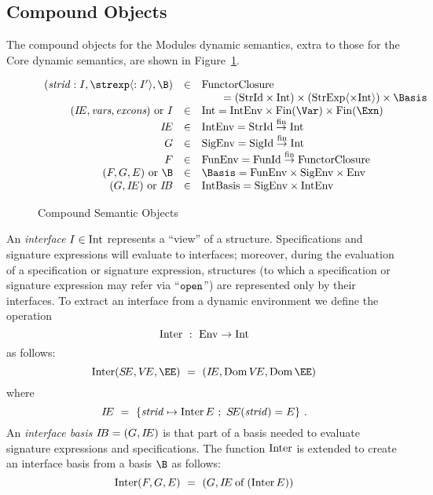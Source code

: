 \subsection{Compound Objects}
\label{dynmod-comp-obj-sec}
The compound objects for the Modules dynamic semantics, extra to those for the
Core dynamic semantics, are shown in Figure~\ref{comp-dynmod-obj}.
\begin{figure}[h]
\vspace{2pt}
\begin{displaymath}
\begin{array}{rcl}
(\strid:\I,\strexp\langle:\I'\rangle,\B)
                & \in   & \FunctorClosure\\
                &       & \qquad  = (\StrId\times\Int)\times
                          (\StrExp\langle\times\Int\rangle)\times\Basis\\
(\IE,\vars,\exns)\ {\rm or}\ \I
                & \in   & \Int = \IntEnv\times\Fin(\Var)\times\Fin(\Exn)\\
        \IE     & \in   & \IntEnv = \finfun{\StrId}{\Int}\\
        \G 	& \in	& \SigEnv = \finfun{\SigId}{\Int}\\
        \F	& \in	& \FunEnv = \finfun{\FunId}{\FunctorClosure}\\
(\F,\G,\E)\ {\rm or}\ \B
                & \in   & \Basis = \FunEnv\times\SigEnv\times\Env\\
(\G,\IE)\ {\rm or}\ \IB
                & \in   & \IntBasis = \SigEnv\times\IntEnv
\end{array}
\end{displaymath}
\caption{Compound Semantic Objects}
\label{comp-dynmod-obj}
\vspace{3pt}
\end{figure}
%
%
An {\sl interface} $I\in{\rm Int}$ represents a ``view'' of a structure.
Specifications and signature expressions will evaluate to interfaces; 
moreover, during the evaluation of a specification or signature expression, 
structures (to which a specification or signature expression may
refer via ``${\tt open}$'') are represented only by their interfaces.  To extract an
interface from a dynamic environment we define the operation
\[ \mathop{\rm Inter}\nolimits\ :\ {\rm Env}\to{\rm Int} \]
as follows:
\[ \Inter(\SE,\VE,\EE)\ =\ (\IE,\Dom\VE,\Dom\EE)\]
where
\[ \IE\ =\ \{\strid\mapsto\Inter\E\ ;\ \SE(\strid)=\E\}\ .\]
An {\sl interface basis} $\mbox{$I\!B$}=(G,\mbox{$I\!E$})$ is that part of a basis needed to
evaluate signature expressions and specifications.
The function $\mathop{\rm Inter}\nolimits$ is extended to create an interface basis
from a basis $\B$ as follows:
\[ \mathop{\rm Inter}\nolimits(F,G,E)\ =\ (G, \mbox{$I\!E$} \mathbin{\rm of} (\mathop{\rm Inter}\nolimits E)) \]


